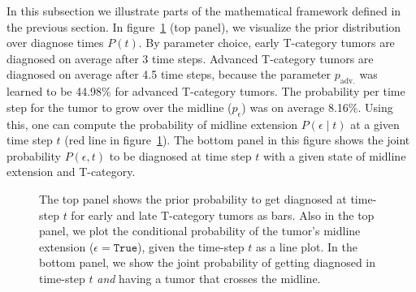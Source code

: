 \documentclass[
  sn-mathphys-num,
]{sn-jnl}
\begin{document}
In this subsection we illustrate parts of the mathematical framework
defined in the previous section. In figure~\ref{fig-model-midext-evo}
(top panel), we visualize the prior distribution over diagnose times
\(P(t)\). By parameter choice, early T-category tumors are diagnosed on
average after 3 time steps. Advanced T-category tumors are diagnosed on
average after 4.5 time steps, because the parameter \(p_\text{adv.}\)
was learned to be 44.98\% for advanced T-category tumors. The
probability per time step for the tumor to grow over the midline
(\(p_\epsilon\)) was on average 8.16\%. Using this, one can compute the
probability of midline extension \(P(\epsilon \mid t)\) at a given time
step \(t\) (red line in figure~\ref{fig-model-midext-evo}). The bottom
panel in this figure shows the joint probability \(P(\epsilon, t)\) to
be diagnosed at time step \(t\) with a given state of midline extension
and T-category.

\begin{figure}


\caption{\label{fig-model-midext-evo}The top panel shows the prior
probability to get diagnosed at time-step \(t\) for early and late
T-category tumors as bars. Also in the top panel, we plot the
conditional probability of the tumor's midline extension
(\(\epsilon=\texttt{True}\)), given the time-step \(t\) as a line plot.
In the bottom panel, we show the joint probability of getting diagnosed
in time-step \(t\) \emph{and} having a tumor that crosses the midline.}

\end{figure}%
\end{document}
